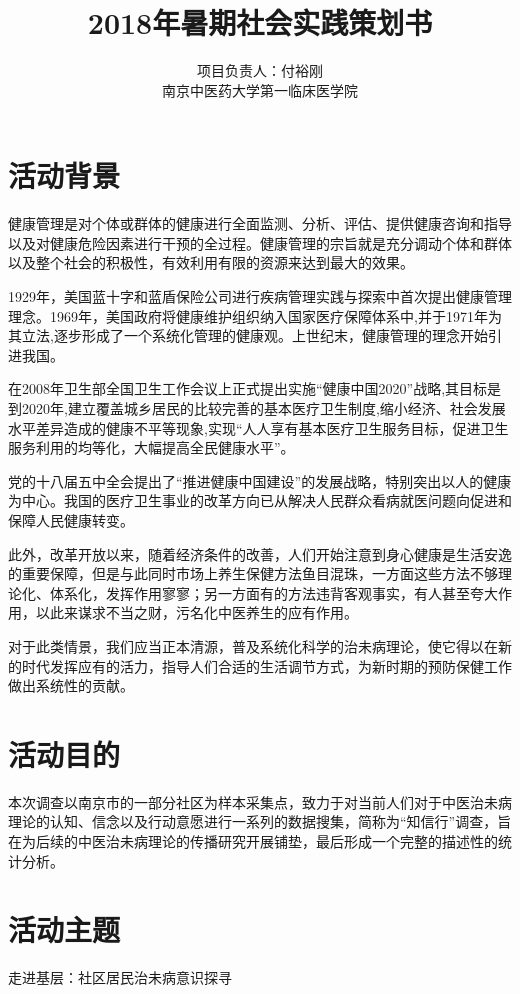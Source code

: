 \documentclass[12pt]{ctexart}
\title{2018年暑期社会实践策划书}
\author{项目负责人：付裕刚\\南京中医药大学\quad 第一临床医学院}
\date{}
\begin{document}
    \maketitle
    \clearpage
    \tableofcontents
    \clearpage

    \vspace{-10 pt}
    \section{活动背景}
    健康管理是对个体或群体的健康进行全面监测、分析、评估、提供健康咨询和指导以及对健康危险因素进行干预的全过程。健康管理的宗旨就是充分调动个体和群体以及整个社会的积极性，有效利用有限的资源来达到最大的效果。
    
    1929年，美国蓝十字和蓝盾保险公司进行疾病管理实践与探索中首次提出健康管理理念。1969年，美国政府将健康维护组织纳入国家医疗保障体系中,并于1971年为其立法,逐步形成了一个系统化管理的健康观。上世纪末，健康管理的理念开始引进我国。
    
    在2008年卫生部全国卫生工作会议上正式提出实施“健康中国2020”战略,其目标是到2020年,建立覆盖城乡居民的比较完善的基本医疗卫生制度,缩小经济、社会发展水平差异造成的健康不平等现象,实现“人人享有基本医疗卫生服务目标，促进卫生服务利用的均等化，大幅提高全民健康水平”。
    
    党的十八届五中全会提出了“推进健康中国建设”的发展战略，特别突出以人的健康为中心。我国的医疗卫生事业的改革方向已从解决人民群众看病就医问题向促进和保障人民健康转变。
    
    此外，改革开放以来，随着经济条件的改善，人们开始注意到身心健康是生活安逸的重要保障，但是与此同时市场上养生保健方法鱼目混珠，一方面这些方法不够理论化、体系化，发挥作用寥寥；另一方面有的方法违背客观事实，有人甚至夸大作用，以此来谋求不当之财，污名化中医养生的应有作用。
    
    对于此类情景，我们应当正本清源，普及系统化科学的治未病理论，使它得以在新的时代发挥应有的活力，指导人们合适的生活调节方式，为新时期的预防保健工作做出系统性的贡献。
    \section{活动目的}
    本次调查以南京市的一部分社区为样本采集点，致力于对当前人们对于中医治未病理论的认知、信念以及行动意愿进行一系列的数据搜集，简称为“知信行”调查，旨在为后续的中医治未病理论的传播研究开展铺垫，最后形成一个完整的描述性的统计分析。
    \section{活动主题}
    走进基层：社区居民治未病意识探寻
\end{document}
